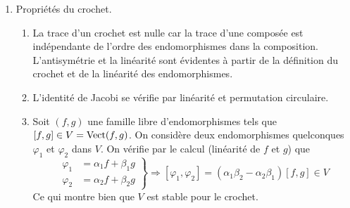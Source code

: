 \begin{enumerate}
  \item Propriétés du crochet.
\begin{enumerate}
  \item La trace d'un crochet est nulle car la trace d'une composée est indépendante de l'ordre des endomorphismes dans la composition. L'antisymétrie et la linéarité sont évidentes à partir de la définition du crochet et de la linéarité des endomorphismes.
  \item L'identité de Jacobi se vérifie par linéarité et permutation circulaire.
  \item Soit $(f,g)$ une famille libre d'endomorphismes tels que $[f,g]\in V = \operatorname{Vect}(f,g)$. On considère deux endomorphismes quelconques $\varphi_1$ et $\varphi_2$ dans $V$. On vérifie par le calcul (linéarité de $f$ et $g$) que 
\begin{displaymath}
\left. 
\begin{aligned}
  \varphi_1 &= \alpha_1 f + \beta_1 g \\ \varphi_2 &= \alpha_2 f + \beta_2 g 
\end{aligned}
\right\rbrace 
\Rightarrow
[\varphi_1,\varphi_2] = (\alpha_1 \beta_2 - \alpha_2 \beta_1)[f,g] \in V
\end{displaymath}
Ce qui montre bien que $V$ est stable pour le crochet.
\end{enumerate}
\end{enumerate}

